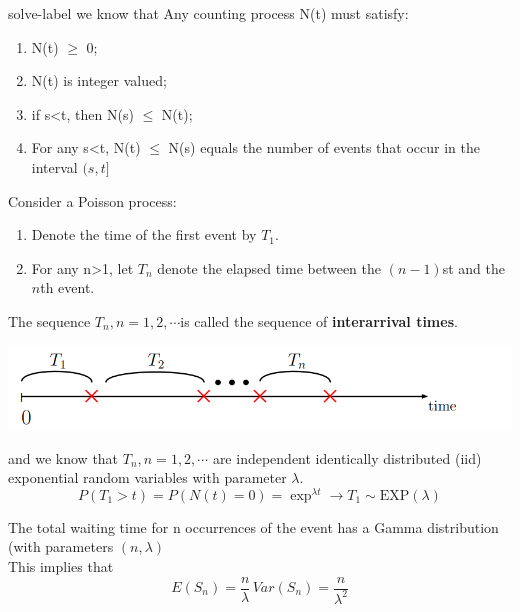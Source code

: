 	\begin{solve}{}{solve-label}
		we know that Any counting process N(t) must satisfy:\\
		\begin{enumerate}
			\item N(t) $\geq$ 0;
			\item N(t) is integer valued;
			\item if s<t, then N(s) $\leq$ N(t);
			\item For any s<t, N(t) $\leq$ N(s) equals the number of events that occur in the interval $(s,t]$
		\end{enumerate}
		Consider a Poisson process:\\
		\begin{enumerate}
			\item 	Denote the time of the first event by $T_1$.
			\item 	For any n>1, let $T_n$ denote the elapsed time between the $(n-1)$st and the $n$th event.
		\end{enumerate}
		The sequence ${T_n,n = 1,2,\cdots} $is called the sequence of \textbf{interarrival times}.

				\includegraphics[width=\textwidth]{pic1.png}
				\label{fig1}
		
		and we know that ${T_n,n=1,2,\cdots}$ are independent identically distributed (iid) exponential random variables with parameter $\lambda$.\\
		$$P(T_1 > t) = P(N(t) = 0) = \exp^{\lambda t} \rightarrow T_1 \sim \text{EXP}(\lambda )$$
		
		The total waiting time for n occurrences of the event has a Gamma distribution (with parameters $(n,\lambda)$
		\\
		This implies that
		$$E(S_n) = \frac{n}{\lambda} \, Var(S_n) = \frac{n}{\lambda^2}$$
		

\end{solve}
